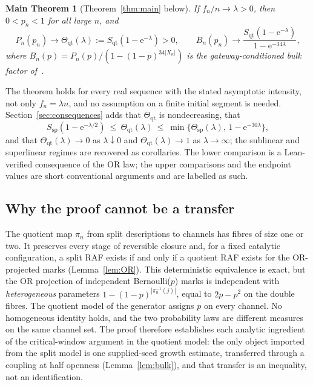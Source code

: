 \documentclass[11pt,a4paper]{article}
\theoremstyle{plain}
\newtheorem*{theorem*}{Main Theorem}
\theoremstyle{definition}
\theoremstyle{remark}
\newcommand{\qt}{\mathrm{qt}}
\newcommand{\spc}{\mathrm{sp}}
\newcommand{\ee}{\mathrm{e}}
\begin{document}
\begin{theorem*}[Theorem~\ref{thm:main} below]
If $f_n/n\to\lambda>0$, then $0<p_n<1$ for all large $n$, and
\[
P_n(p_n)\longrightarrow\Theta_{\qt}(\lambda):=S_{\qt}(1-\ee^{-\lambda})>0,\qquad
B_n(p_n)\longrightarrow\frac{S_{\qt}(1-\ee^{-\lambda})}{1-\ee^{-34\lambda}},
\]
where $B_n(p)=P_n(p)/(1-(1-p)^{34|X_n|})$ is the gateway-conditioned bulk factor of~\cite{overlapgateway2026}.
\end{theorem*}

The theorem holds for every real sequence with the stated asymptotic intensity, not only $f_n=\lambda n$, and no assumption on a finite initial segment is needed. Section~\ref{sec:consequences} adds that $\Theta_{\qt}$ is nondecreasing, that
\[
S_{\spc}(1-\ee^{-\lambda/2})\ \le\ \Theta_{\qt}(\lambda)\ \le\ \min\{\Theta_{\spc}(\lambda),\,1-\ee^{-30\lambda}\},
\]
and that $\Theta_{\qt}(\lambda)\to0$ as $\lambda\downarrow0$ and $\Theta_{\qt}(\lambda)\to1$ as $\lambda\to\infty$; the sublinear and superlinear regimes are recovered as corollaries. The lower comparison is a Lean-verified consequence of the OR law; the upper comparisons and the endpoint values are short conventional arguments and are labelled as such.

\subsection*{Why the proof cannot be a transfer}
The quotient map $\pi_n$ from split descriptions to channels has fibres of size one or two. It preserves every stage of reversible closure and, for a fixed catalytic configuration, a split RAF exists if and only if a quotient RAF exists for the OR-projected marks (Lemma~\ref{lem:OR}). This deterministic equivalence is exact, but the OR projection of independent Bernoulli($p$) marks is independent with \emph{heterogeneous} parameters $1-(1-p)^{|\pi_n^{-1}(j)|}$, equal to $2p-p^2$ on the double fibres. The quotient model of the generator assigns $p$ on every channel. No homogeneous identity holds, and the two probability laws are different measures on the same channel set. The proof therefore establishes each analytic ingredient of the critical-window argument in the quotient model: the only object imported from the split model is one supplied-seed growth estimate, transferred through a coupling at half openness (Lemma~\ref{lem:bulk}), and that transfer is an inequality, not an identification.
\end{document}
